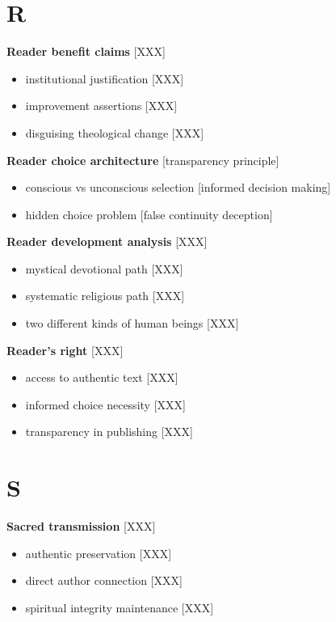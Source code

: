 \documentclass[11pt,twoside]{book}
\begin{document}
\section*{R}
\label{sec:orgc131b0f}

\textbf{\textbf{Reader benefit claims}} {[}XXX]
\begin{itemize}
\item institutional justification [XXX]
\item improvement assertions [XXX]
\item disguising theological change [XXX]
\end{itemize}

\textbf{\textbf{Reader choice architecture}} {[}transparency principle]
\begin{itemize}
\item conscious vs unconscious selection [informed decision making]
\item hidden choice problem [false continuity deception]
\end{itemize}

\textbf{\textbf{Reader development analysis}} {[}XXX]
\begin{itemize}
\item mystical devotional path [XXX]
\item systematic religious path [XXX]
\item two different kinds of human beings [XXX]
\end{itemize}

\textbf{\textbf{Reader's right}} {[}XXX]
\begin{itemize}
\item access to authentic text [XXX]
\item informed choice necessity [XXX]
\item transparency in publishing [XXX]
\end{itemize}
\section*{S}
\label{sec:org33173df}

\textbf{\textbf{Sacred transmission}} {[}XXX]
\begin{itemize}
\item authentic preservation [XXX]
\item direct author connection [XXX]
\item spiritual integrity maintenance [XXX]
\end{itemize}
\end{document}
